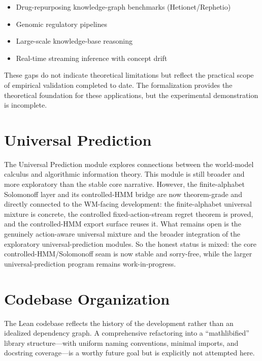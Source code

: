 \documentclass[11pt,openany]{report}
\begin{document}
\begin{itemize}
\item Drug-repurposing knowledge-graph benchmarks
  (Hetionet/Rephetio)
\item Genomic regulatory pipelines
\item Large-scale knowledge-base reasoning
\item Real-time streaming inference with concept drift
\end{itemize}

\noindent
These gaps do not indicate theoretical limitations but reflect the
practical scope of empirical validation completed to date.  The
formalization provides the theoretical foundation for these
applications, but the experimental demonstration is incomplete.

\section{Universal Prediction}

The Universal Prediction module explores connections between the
world-model calculus and algorithmic information theory.  This module
is still broader and more exploratory than the stable core narrative.
However, the finite-alphabet Solomonoff layer and its controlled-HMM
bridge are now theorem-grade and directly connected to the WM-facing
development: the finite-alphabet universal mixture is concrete, the
controlled fixed-action-stream regret theorem is proved, and the
controlled-HMM export surface reuses it.  What remains open is the
genuinely action-aware universal mixture and the broader integration of
the exploratory universal-prediction modules.  So the honest status is
mixed: the core controlled-HMM/Solomonoff seam is now stable and
sorry-free, while the larger universal-prediction program remains
work-in-progress.

\section{Codebase Organization}

The Lean codebase reflects the history of the development rather than
an idealized dependency graph.  A comprehensive refactoring into a
``mathlibified'' library structure---with uniform naming conventions,
minimal imports, and docstring coverage---is a worthy future goal but
is explicitly not attempted here.


\end{document}
